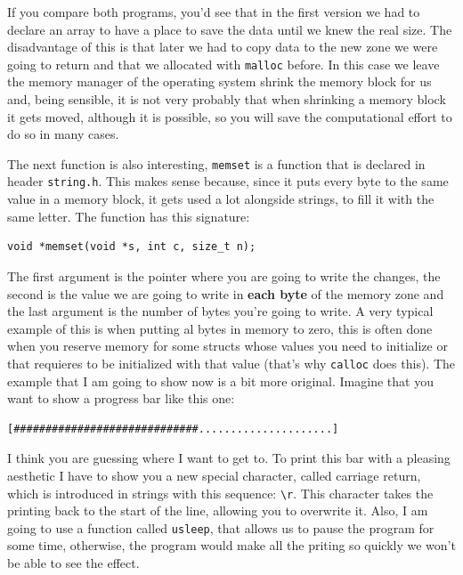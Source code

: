 \documentclass[a4paper]{article}
\begin{document}
If you compare both programs, you'd see that in the first version we had to
declare an array to have a place to save the data until we knew the real
size. The disadvantage of this is that later we had to copy data to the new zone
we were going to return and that we allocated with \verb"malloc" before.
In this case we leave the memory manager of the operating system shrink the
memory block for us and, being sensible, it is not very probably that when
shrinking a memory block it gets moved, although it is possible, so you will
save the computational effort to do so in many cases.

The next function is also interesting, \verb!memset! is a function that is
declared in header \verb!string.h!. This makes sense because, since it puts
every byte to the same value in a memory block, it gets used a lot alongside
strings, to fill it with the same letter. The function has this signature:

\noindent
\begin{minipage}[H]{\linewidth}
\mbox{}
\begin{lstlisting}[style=C,
caption={Signature of function \texttt{memset}},
label={lst:memsetSignature}]
void *memset(void *s, int c, size_t n);
\end{lstlisting}
\end{minipage}

The first argument is the pointer where you are going to write the changes, the
second is the value we are going to write in \textbf{each byte} of the memory
zone and the last argument is the number of bytes you're going to write. A very
typical example of this is when putting al bytes in memory to zero, this is
often done when you reserve memory for some structs whose values you need to
initialize or that requieres to be initialized with that value (that's why
\verb"calloc" does this). The example that I am going to show now is a bit more
original. Imagine that you want to show a progress bar like this one:
\begin{verbatim}
[#############################.....................]
\end{verbatim}

I think you are guessing where I want to get to. To print this bar with a
pleasing aesthetic I have to show you a new special character, called carriage
return, which is introduced in strings with this sequence: \verb!\r!. This
character takes the printing back to the start of the line, allowing you to
overwrite it. Also, I am going to use a function called \verb!usleep!, that
allows us to pause the program for some time, otherwise, the program would make
all the priting so quickly we won't be able to see the effect.
\end{document}
